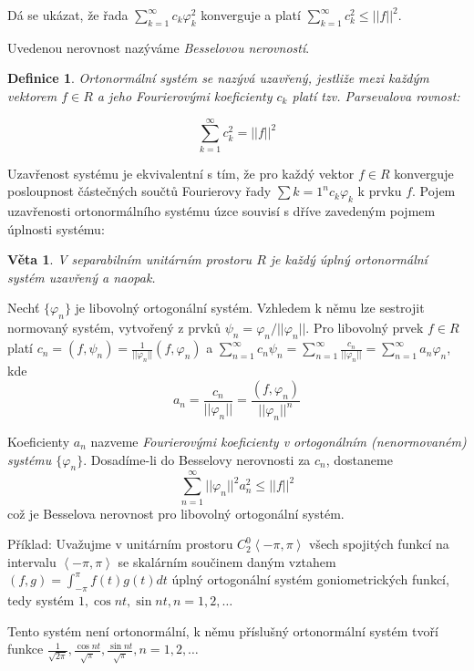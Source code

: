 \documentclass[a4paper, 11pt]{report}
\newtheorem{mydef}{Definice}[chapter]
\newtheorem{veta}{Věta}[chapter]
\begin{document}
Dá se ukázat, že řada $\sum\limits_{k=1}^\infty c_k \varphi_k^2$  konverguje a platí
$\sum\limits_{k=1}^\infty c_k^2 \leq ||f||^2$.

Uvedenou nerovnost nazýváme \emph{Besselovou nerovností}.

\begin{mydef}
Ortonormální systém se nazývá \emph{uzavřený}, jestliže mezi každým vektorem $f \in R$ a jeho Fourierovými koeficienty $c_k$ platí tzv. \emph{Parsevalova rovnost}:

$$\sum\limits_{k=1}^\infty c_k^2 = ||f||^2$$
\end{mydef}

Uzavřenost systému je ekvivalentní s tím, že pro každý vektor $f \in R$ konverguje posloupnost částečných součtů Fourierovy řady $\sum{k=1}^n c_k \varphi_k$ k prvku $f$. Pojem uzavřenosti ortonormálního systému úzce souvisí s dříve zavedeným pojmem úplnosti systému:

\begin{veta}
V separabilním unitárním prostoru $R$ je každý úplný ortonormální systém uzavřený a naopak.
\end{veta}

Nechť $\{\varphi_n\}$ je libovolný ortogonální systém. Vzhledem k němu lze sestrojit normovaný systém, vytvořený z prvků $\psi_n = \varphi_n/||\varphi_n||$. Pro libovolný prvek $f \in R$ platí
$c_n = (f, \psi_n) = \frac{1}{||\varphi_n||}(f, \varphi_n)$ a 
$\sum_{n=1}^\infty c_n \psi_n = \sum_{n=1}^\infty \frac{c_n}{||\varphi_n||} = \sum_{n=1}^\infty a_n \varphi_n$, kde
$$a_n = \frac{c_n}{||\varphi_n||} = \frac{(f,\varphi_n)}{||\varphi_n||^n}$$

Koeficienty $a_n$ nazveme \emph{Fourierovými koeficienty v ortogonálním (nenormovaném) systému $\{\varphi_n\}$}. Dosadíme-li do Besselovy nerovnosti za $c_n$, dostaneme
$$\sum\limits_{n=1}^\infty ||\varphi_n||^2a_n^2 \leq ||f||^2$$
což je Besselova nerovnost pro libovolný ortogonální systém.

Příklad: Uvažujme v unitárním prostoru $C_2^0\left<-\pi, \pi\right>$ všech spojitých funkcí na intervalu $\left<-\pi, \pi\right>$ se skalárním součinem daným vztahem $(f, g) = \int_{-\pi}^\pi f(t) g(t) dt$ úplný ortogonální systém goniometrických funkcí, tedy systém
$1, \cos nt, \sin nt, n = 1, 2, \dots$

Tento systém není ortonormální, k němu příslušný ortonormální systém tvoří funkce
$\frac{1}{\sqrt{2\pi}}, \frac{\cos nt}{\sqrt{\pi}}, \frac{\sin nt}{\sqrt{\pi}}, n = 1, 2, \dots$
\end{document}
